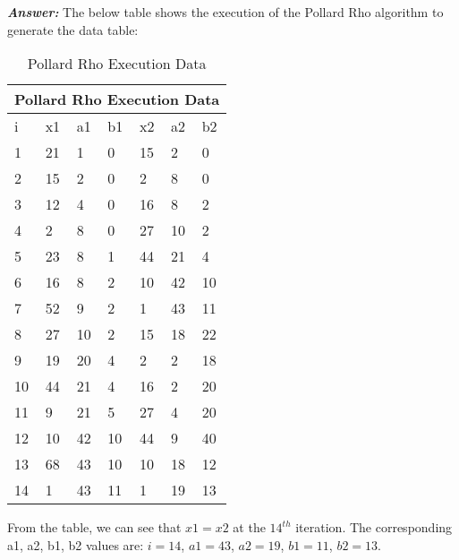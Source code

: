 \documentclass[11pt,a4paper,fleqn]{article}
\begin{document}
\begin{enumerate}[1.]
		\begin{flushleft}
			\textbf{\textit{Answer:}} The below table shows the execution of the Pollard Rho algorithm to generate the data table:
			\begin{table}[H]
				\begin{adjustbox}{scale=0.9,center}
				\begin{tabular}{ |p{2cm}|p{2cm}|p{2cm}|p{2cm}||p{2cm}|p{2cm}|p{2cm}| }
				\hline
				\multicolumn{7}{|c|}{Pollard Rho Execution Data} \\
				\hline
				i & x1 & a1 & b1 & x2 & a2 & b2 \\ \hline
				1 & 21 & 1 & 0 & 15 & 2 & 0 \\ \hline
				2 & 15 & 2 & 0 & 2 & 8 & 0 \\ \hline
				3 & 12 & 4 & 0 & 16 & 8 & 2 \\ \hline
				4 & 2 & 8 & 0 & 27 & 10 & 2 \\ \hline
				5 & 23 & 8 & 1 & 44 & 21 & 4 \\ \hline
				6 & 16 & 8 & 2 & 10 & 42 & 10 \\ \hline
				7 & 52 & 9 & 2 & 1 & 43 & 11 \\ \hline
				8 & 27 & 10 & 2 & 15 & 18 & 22 \\ \hline
				9 & 19 & 20 & 4 & 2 & 2 & 18 \\ \hline
				10 & 44 & 21 & 4 & 16 & 2 & 20 \\ \hline
				11 & 9 & 21 & 5 & 27 & 4 & 20 \\ \hline
				12 & 10 & 42 & 10 & 44 & 9 & 40 \\ \hline
				13 & 68 & 43 & 10 & 10 & 18 & 12 \\ \hline
				14 & 1 & 43 & 11 & 1 & 19 & 13 \\ \hline
				\end{tabular}
				\end{adjustbox}
				\caption{Pollard Rho Execution Data}
				\label{table:pollards-rho}
			\end{table}
			
			From the table, we can see that $x1 = x2$ at the $14^{th}$ iteration. The corresponding a1, a2, b1, b2 values are: $i = 14$, $a1 = 43$, $a2 = 19$, $b1 = 11$, $b2 = 13$.
			

\end{flushleft}
\end{enumerate}
\end{document}
